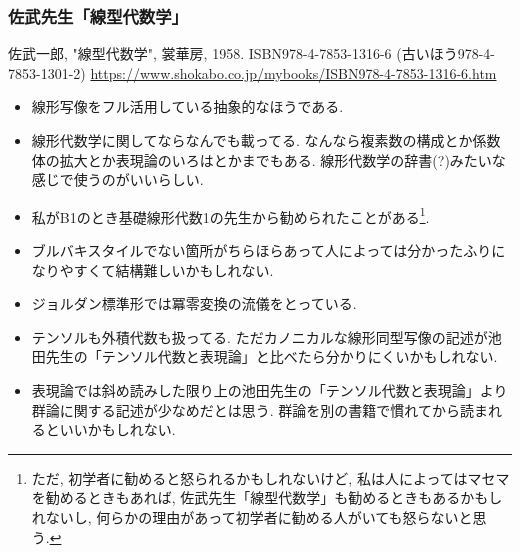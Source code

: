 \documentclass[10pt,a4paper]{jsarticle}
\begin{document}
\subsubsection*{佐武先生「線型代数学」}
佐武一郎, "線型代数学", 裳華房, 1958. ISBN978-4-7853-1316-6 (古いほう978-4-7853-1301-2) \url{https://www.shokabo.co.jp/mybooks/ISBN978-4-7853-1316-6.htm}
\begin{itemize}
    \item 線形写像をフル活用している抽象的なほうである. 
    \item 線形代数学に関してならなんでも載ってる. なんなら複素数の構成とか係数体の拡大とか表現論のいろはとかまでもある. 線形代数学の辞書(?)みたいな感じで使うのがいいらしい. 
    \item 私がB1のとき基礎線形代数1の先生から勧められたことがある\footnote{ただ, 初学者に勧めると怒られるかもしれないけど, 私は人によってはマセマを勧めるときもあれば, 佐武先生「線型代数学」も勧めるときもあるかもしれないし, 何らかの理由があって初学者に勧める人がいても怒らないと思う. }. 
    \item ブルバキスタイルでない箇所がちらほらあって人によっては分かったふりになりやすくて結構難しいかもしれない. 
    \item ジョルダン標準形では冪零変換の流儀をとっている. 
    \item テンソルも外積代数も扱ってる. ただカノニカルな線形同型写像の記述が池田先生の「テンソル代数と表現論」と比べたら分かりにくいかもしれない. 
    \item 表現論では斜め読みした限り上の池田先生の「テンソル代数と表現論」より群論に関する記述が少なめだとは思う. 群論を別の書籍で慣れてから読まれるといいかもしれない. 
\end{itemize}
\end{document}

